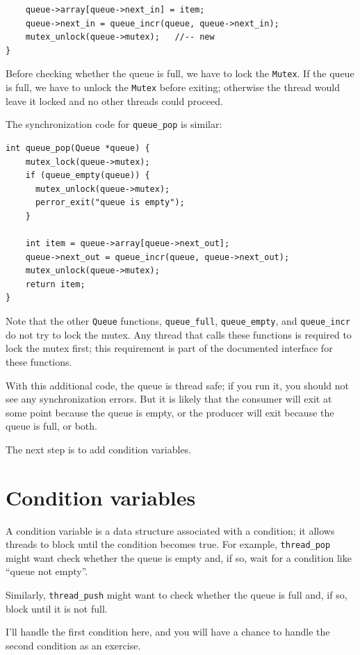 \documentclass[12pt]{book}
\begin{document}
{\begin{verbatim}
    queue->array[queue->next_in] = item;
    queue->next_in = queue_incr(queue, queue->next_in);
    mutex_unlock(queue->mutex);   //-- new
}
\end{verbatim}

Before checking whether the queue is full, we have to lock
the {\tt Mutex}.  If the queue is full, we have to unlock
the {\tt Mutex} before exiting; otherwise the thread would leave
it locked and no other threads could proceed.

The synchronization code for \verb"queue_pop" is similar:

\begin{verbatim}
int queue_pop(Queue *queue) {
    mutex_lock(queue->mutex);
    if (queue_empty(queue)) {
      mutex_unlock(queue->mutex);
      perror_exit("queue is empty");
    }
  
    int item = queue->array[queue->next_out];
    queue->next_out = queue_incr(queue, queue->next_out);
    mutex_unlock(queue->mutex);
    return item;
}
\end{verbatim}

Note that the other {\tt Queue} functions, \verb"queue_full",
\verb"queue_empty", and \verb"queue_incr" do not try to lock
the mutex.  Any thread that calls these functions is required to
lock the mutex first; this requirement is part of the documented
interface for these functions.

With this additional code, the queue is thread safe; if you run it, you
should not see any synchronization errors.  But it is likely
that the consumer will exit at some point because the queue is
empty, or the producer will exit because the queue is full,
or both.

The next step is to add condition variables.


\section{Condition variables}

A condition variable is a data structure associated with a condition;
it allows threads to block until the condition becomes true.  For
example, \verb"thread_pop" might want check whether the queue is
empty and, if so, wait for a condition like ``queue not empty''.

Similarly, \verb"thread_push" might want to check whether the queue is
full and, if so, block until it is not full.

I'll handle the first condition here, and you will have a chance to
handle the second condition as an exercise.

}
\end{document}
